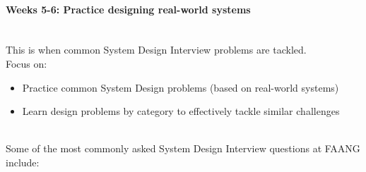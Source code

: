 \paragraph{Weeks 5-6: Practice designing real-world systems}\label{fddGpMTaZkOFs7sT7Bhth}
\\
This is when common System Design Interview problems are tackled.
\\
Focus on:

\begin{itemize}
\item
\protect{}\label{-WfhBr6hnH2wyvRfpGQgs}
Practice common System Design problems (based on real-world systems)
\item
\protect{}\label{H-kkHicGvtnbFsEUfD9fs}
Learn design problems by category to effectively tackle similar challenges
\end{itemize}
\\
Some of the most commonly asked System Design Interview questions at FAANG include:

